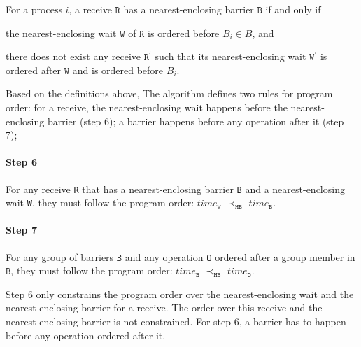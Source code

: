 \begin{definition}\label{def:nb}
For a process $i$, a receive $\mathtt{R}$ has a nearest-enclosing barrier $\mathtt{B}$ if and only if
\begin{compactenum}
\item the nearest-enclosing wait $\mathtt{W}$ of $\mathtt{R}$ is ordered before $B_i\in B$, and
\item there does not exist any receive $\mathtt{R^\prime}$ such that its nearest-enclosing wait $\mathtt{W^\prime}$ is ordered after $\mathtt{W}$ and is ordered before $B_i$.
\end{compactenum}
\end{definition}

Based on the definitions above, The algorithm defines two rules for program order: for a receive, the nearest-enclosing wait happens before the nearest-enclosing barrier (step 6); a barrier happens before any operation after it (step 7);

\paragraph*{Step 6} For any receive \texttt{R} that has a nearest-enclosing barrier \texttt{B} and a nearest-enclosing wait \texttt{W}, they must follow the program order:
$\mathit{time}_\mathtt{W}$ $\prec_\mathtt{HB}$ $\mathit{time}_\mathtt{B}$.

\paragraph*{Step 7} For any group of barriers $\mathtt{B}$ and any operation $\mathtt{O}$ ordered after a group member in $\mathtt{B}$, they must follow the program order: $\mathit{time}_\mathtt{B}$
$\prec_\mathtt{HB}$ $\mathit{time}_\mathtt{O}$.

Step $6$ only constrains the program order over the nearest-enclosing wait and the nearest-enclosing barrier for a receive. The order over this receive and the nearest-enclosing barrier is not constrained. For step $6$, a barrier has to happen before any operation ordered after it. 


